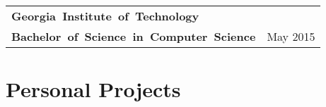 \documentclass[letterpaper, oneside, final, 10pt]{scrartcl} %
\newcommand{\gray}{\rowcolor[gray]{.90}} %
\begin{document}
\begin{center}
\begin{tabularx}{\linewidth}{Xl}
\gray \textbf{\mbox{Georgia Institute of Technology}} & \\
\gray \textbf{\mbox{Bachelor of Science in Computer Science}} & May 2015
\end{tabularx}

\vspace{-14pt} %


\section{Personal Projects}


\end{center}
\end{document}
